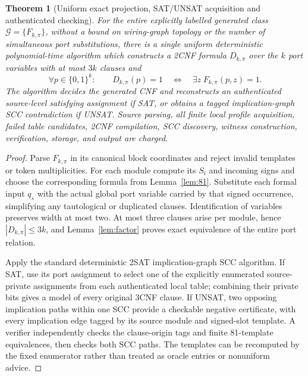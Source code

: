 \documentclass[11pt]{article}
\newtheorem{theorem}{Theorem}
\begin{document}
\begin{theorem}[Uniform exact projection, SAT/UNSAT acquisition and authenticated checking]\label{thm:main}
For the entire explicitly labelled generated class $\mathcal G=\{F_{k,\pi}\}$, without a bound on wiring-graph topology or the number of simultaneous port substitutions, there is a single uniform deterministic polynomial-time algorithm which constructs a 2CNF formula $D_{k,\pi}$ over the $k$ port variables with at most $3k$ clauses and
\[
 \forall p\in\{0,1\}^{k}:\qquad
 D_{k,\pi}(p)=1\quad\Longleftrightarrow\quad
 \exists z\;F_{k,\pi}(p,z)=1.
\]
The algorithm decides the generated CNF and reconstructs an authenticated source-level satisfying assignment if SAT, or obtains a tagged implication-graph SCC contradiction if UNSAT. Source parsing, all finite local profile acquisition, failed table candidates, 2CNF compilation, SCC discovery, witness construction, verification, storage, and output are charged.
\end{theorem}
\begin{proof}
Parse $F_{k,\pi}$ in its canonical block coordinates and reject invalid templates or token multiplicities. For each module compute its $S_i$ and incoming signs and choose the corresponding formula from Lemma~\ref{lem:81}. Substitute each formal input $q_s$ with the actual global port variable carried by that signed occurrence, simplifying any tautological or duplicated clauses. Identification of variables preserves width at most two. At most three clauses arise per module, hence $|D_{k,\pi}|\le3k$, and Lemma~\ref{lem:factor} proves exact equivalence of the entire port relation.

Apply the standard deterministic 2SAT implication-graph SCC algorithm. If SAT, use its port assignment to select one of the explicitly enumerated source-private assignments from each authenticated local table; combining their private bits gives a model of every original 3CNF clause. If UNSAT, two opposing implication paths within one SCC provide a checkable negative certificate, with every implication edge tagged by its source module and signed-slot template. A verifier independently checks the clause-origin tags and finite 81-template equivalences, then checks both SCC paths. The templates can be recomputed by the fixed enumerator rather than treated as oracle entries or nonuniform advice.
\end{proof}
\end{document}
